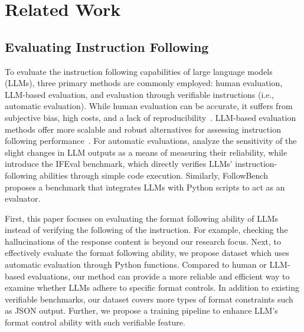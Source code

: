 \section{Related Work}
\subsection{Evaluating Instruction Following} 

To evaluate the instruction following capabilities of large language models (LLMs), three primary methods are commonly employed: human evaluation, LLM-based evaluation, and evaluation through verifiable instructions (i.e., automatic evaluation). While human evaluation can be accurate, it suffers from subjective bias, high costs, and a lack of reproducibility~\citep{ouyang2022training, bang2023multitask, wang2023pandalm, xu2023wizardlm}. 
LLM-based evaluation methods offer more scalable and robust alternatives for assessing instruction following performance~\citep{lin-chen-2023-llm, liu2303g, qin2024infobench, he2024complex, sun2024conifer, xia2024fofo}. 
For automatic evaluations, \citet{jain2023bring} analyze the sensitivity of the slight changes in LLM outputs as a means of measuring their reliability, while \citet{ifeval} introduce the IFEval benchmark, which directly verifies LLMs' instruction-following abilities through simple code execution. Similarly, FollowBench~\citep{jiang2023followbench} proposes a benchmark that integrates LLMs with Python scripts to act as an evaluator.


First, this paper focuses on evaluating the format following ability of LLMs instead of verifying the following of the instruction. For example, checking the hallucinations of the response content is beyond our research focus.
Next, to effectively evaluate the format following ability, we propose \dataset dataset which uses automatic evaluation through Python functions.
Compared to human or LLM-based evaluations, our method can provide a more reliable and efficient way to examine whether LLMs adhere to specific format controls.
In addition to existing verifiable benchmarks, our dataset covers more types of format constraints such as JSON output. Further, we propose a training pipeline to enhance LLM's format control ability with such verifiable feature. 

